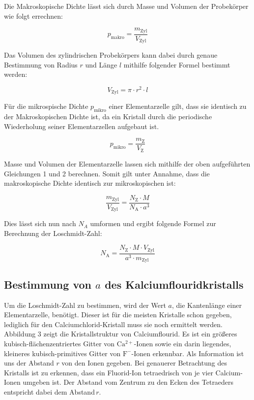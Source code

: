 \documentclass[12pt,a4paper,titlepage,headinclude,bibtotoc]{scrartcl}
\begin{document}
Die Makroskopische Dichte lässt sich durch  Masse und Volumen der Probekörper wie folgt errechnen:

\begin{equation}
p_\mathrm{makro}= \frac{m_\mathrm{Zyl}}{V_\mathrm{Zyl}}
\end{equation}

Das Volumen des zylindrischen Probekörpers kann dabei durch genaue Bestimmung von Radius $r$ und Länge $l$ mithilfe folgender Formel bestimmt werden:

\begin{equation}
V_\mathrm{Zyl} = \pi \cdot r^{2} \cdot l
\end{equation}

Für die mikrospische Dichte $p_\mathrm{mikro}$ einer Elementarzelle gilt, dass sie identisch zu der Makroskopischen Dichte ist, da ein Kristall durch die periodische Wiederholung seiner Elementarzellen aufgebaut ist.

\begin{equation}
p_\mathrm{mikro}=\frac{m_\mathrm{Z}}{V_\mathrm{Z}}
\end{equation}

Masse und Volumen der Elementarzelle lassen sich mithilfe der oben aufgeführten Gleichungen 1 und 2 berechnen. Somit gilt unter Annahme, dass die makroskopische Dichte identisch zur mikroskopischen ist:

\begin{equation}
\frac{m_\mathrm{Zyl}}{V_\mathrm{Zyl}}= \frac{N_\mathrm{Z} \cdot M}{N_\mathrm{A} \cdot a^3}
\end{equation}

Dies lässt sich nun nach $N_A$ umformen und ergibt folgende Formel zur Berechnung der Loschmidt-Zahl:

\begin{equation}
N_\mathrm{A}= \frac{N_\mathrm{Z} \cdot M \cdot V_\mathrm{Zyl}}{a^3 \cdot m_\mathrm{Zyl}}
\end{equation}

\subsection{Bestimmung von $a$ des Kalciumflouridkristalls}
 
Um die Loschmidt-Zahl zu bestimmen, wird der Wert $a$, die Kantenlänge einer Elementarzelle, benötigt. Dieser ist für die meisten Kristalle schon gegeben, lediglich für den Calciumchlorid-Kristall muss sie noch ermittelt werden. Abbildung 3 zeigt die Kristallstruktur von Calciumflourid. Es ist ein größeres kubisch-flächenzentriertes Gitter von $ \mathrm {Ca^{2+}}$-Ionen sowie ein darin liegendes, kleineres kubisch-primitives Gitter von $ \mathrm{F^-}$-Ionen erkennbar. Als Information ist uns der Abstand $r$ von den Ionen gegeben. Bei genauerer Betrachtung des Kristalls ist zu erkennen, dass ein Fluorid-Ion tetraedrisch von je vier Calcium-Ionen umgeben ist. Der Abstand vom Zentrum zu den Ecken des Tetraeders entspricht dabei dem Abstand\,$r$.
\end{document}
